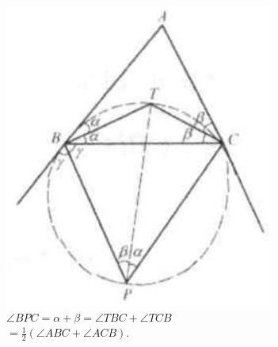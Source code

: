 \documentclass{article}
\begin{document}
\centering
\includegraphics[width=\textwidth]{images/reasoning_image_1.jpg}\\
\(\angle B P C=\alpha+\beta=\angle T B C+\angle T C B\)\\
\(=\frac{1}{2}(\angle A B C+\angle A C B)\).
\end{document}
